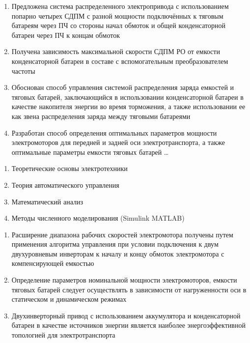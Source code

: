 {\novelty}
\begin{enumerate}

  \item Предложена система распределенного электропривода с использованием попарно четырех  СДПМ с разной мощности подключённых к тяговым батареям через ПЧ со стороны начал 	обмоток и общей конденсаторной батареи через ПЧ к концам обмоток
  \item Получена зависимость максимальной скорости СДПМ РО от емкости конденсаторной батареи в составе с вспомогательным преобразователем частоты
  \item Обоснован способ управления системой распределения заряда емкостей и тяговых батарей, заключающийся в использовании конденсаторной батареи в качестве накопителя энергии во время торможения, а также использовании ее как звена распределения заряда между тяговыми батареями
  \item Разработан способ определения оптимальных параметров мощности электромоторов для передней и задней оси электротранспорта, а также оптимальные параметры емкости тяговых батарей \ldots
  
\end{enumerate}


{\methods} 
\begin{enumerate}
	\item Теоретические основы электротехники
	\item Теория автоматического управления
	\item Математический анализ
	\item Методы численного моделирования (Simulink MATLAB)
\end{enumerate}
{}
\begin{enumerate}
  \item Расширение диапазона рабочих скоростей электромотора получены путем применения алгоритма управления при условии подключения к двум двухуровневым инверторам к началу и концу обмоток электромотора с компенсирующей емкостью
  \item Определение параметров номинальной мощности электромоторов, емкости тяговых батарей следует осуществлять в зависимости от нагруженности оси в статическом и динамическом режимах
  \item Двухинверторный привод с использованием аккумулятора и конденсаторной батареи в качестве источников энергии является наиболее энергоэффективной топологией для электротранспорта
\end{enumerate}

